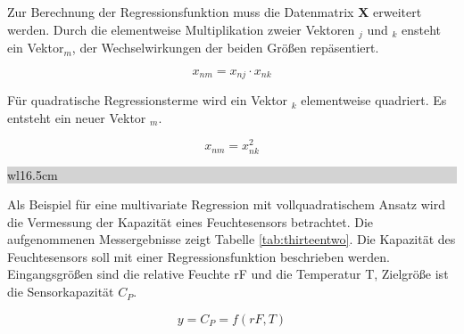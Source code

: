 \noindent Zur Berechnung der Regressionsfunktion muss die Datenmatrix \textbf{X} erweitert werden. Durch die elementweise Multiplikation zweier Vektoren $_{j}$ und $_{k}$ ensteht ein Vektor$_{m}$, der Wechselwirkungen der beiden Gr\"{o}{\ss}en rep\"{a}sentiert.

\begin{equation}\label{eq:thirteentwentyseven}
x_{nm} =x_{nj} \cdot x_{nk}
\end{equation}

\noindent F\"{u}r quadratische Regressionsterme wird ein Vektor $_{k}$ elementweise quadriert. Es entsteht ein neuer Vektor $_{m}$.

\begin{equation}\label{eq:thirteentwentyeight}
x_{nm} =x_{nk}^{2}
\end{equation}

\clearpage

\noindent
\colorbox{lightgray}{%
%
\renewcommand\arraystretch{0.6}%
\begin{tabular}{ wl{16.5cm} }
{\selectfont
{}}
\end{tabular}%
}\bigskip

\noindent Als Beispiel f\"{u}r eine multivariate Regression mit vollquadratischem Ansatz wird die Vermessung der Kapazit\"{a}t eines Feuchtesensors betrachtet. Die aufgenommenen Messergebnisse zeigt Tabelle \ref{tab:thirteentwo}. Die Kapazit\"{a}t des Feuchtesensors soll mit einer Regressionsfunktion beschrieben werden. Eingangsgr\"{o}{\ss}en sind die relative Feuchte rF und die Temperatur T, Zielgr\"{o}{\ss}e ist die Sensorkapazit\"{a}t $C_{P}$.

\begin{equation}\label{eq:thirteentwentynine}
y=C_{P} =f(rF,T)
\end{equation}

